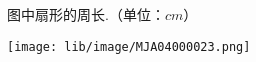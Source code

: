 图中扇形的周长.（单位：$cm$）

\begin{flushright}

    \texttt{[image: lib/image/MJA04000023.png]}

\end{flushright}



